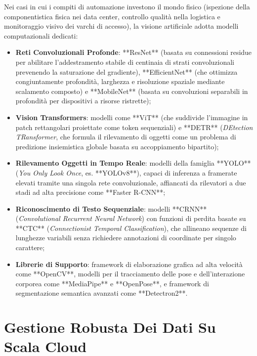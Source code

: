 \documentclass[11pt, a4paper]{article}
\begin{document}
Nei casi in cui i compiti di automazione investono il mondo fisico (ispezione della componentistica fisica nei data center, controllo qualità nella logistica e monitoraggio visivo dei varchi di accesso), la visione artificiale adotta modelli computazionali dedicati:
\begin{itemize}
    \item \textbf{Reti Convoluzionali Profonde}: **ResNet** (basata su connessioni residue per abilitare l'addestramento stabile di centinaia di strati convoluzionali prevenendo la saturazione del gradiente), **EfficientNet** (che ottimizza congiuntamente profondità, larghezza e risoluzione spaziale mediante scalamento composto) e **MobileNet** (basata su convoluzioni separabili in profondità per dispositivi a risorse ristrette);
    \item \textbf{Vision Transformers}: modelli come **ViT** (che suddivide l'immagine in patch rettangolari proiettate come token sequenziali) e **DETR** (\emph{DEtection TRansformer}, che formula il rilevamento di oggetti come un problema di predizione insiemistica globale basata su accoppiamento bipartito);
    \item \textbf{Rilevamento Oggetti in Tempo Reale}: modelli della famiglia **YOLO** (\emph{You Only Look Once}, es. **YOLOv8**), capaci di inferenza a framerate elevati tramite una singola rete convoluzionale, affiancati da rilevatori a due stadi ad alta precisione come **Faster R-CNN**;
    \item \textbf{Riconoscimento di Testo Sequenziale}: modelli **CRNN** (\emph{Convolutional Recurrent Neural Network}) con funzioni di perdita basate su **CTC** (\emph{Connectionist Temporal Classification}), che allineano sequenze di lunghezze variabili senza richiedere annotazioni di coordinate per singolo carattere;
    \item \textbf{Librerie di Supporto}: framework di elaborazione grafica ad alta velocità come **OpenCV**, modelli per il tracciamento delle pose e dell'interazione corporea come **MediaPipe** e **OpenPose**, e framework di segmentazione semantica avanzati come **Detectron2**.
\end{itemize}

\newpage


\section{Gestione Robusta Dei Dati Su Scala Cloud}
\end{document}
